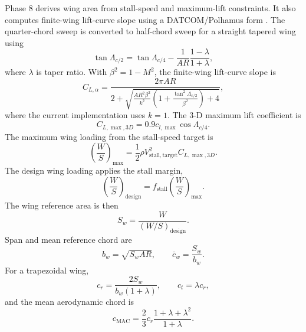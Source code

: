 Phase 8 derives wing area from stall-speed and maximum-lift constraints. It also computes finite-wing lift-curve slope using a DATCOM/Polhamus form \cite{USAFDATCOM1978,Polhamus1958}. The quarter-chord sweep is converted to half-chord sweep for a straight tapered wing using
\begin{equation}
    \tan \Lambda_{c/2}
    =
    \tan \Lambda_{c/4}
    -
    \frac{1}{AR}\frac{1-\lambda}{1+\lambda},
    \label{eq:ppa_half_chord_sweep}
\end{equation}
where \(\lambda\) is taper ratio. With \(\beta^2=1-M^2\), the finite-wing lift-curve slope is
\begin{equation}
    C_{L,\alpha}
    =
    \frac{2\pi AR}
    {2+
    \sqrt{
    \frac{AR^2\beta^2}{k^2}
    \left(1+\frac{\tan^2\Lambda_{c/2}}{\beta^2}\right)+4
    }},
    \label{eq:ppa_datcom_lift_slope}
\end{equation}
where the current implementation uses \(k=1\). The 3-D maximum lift coefficient is
\begin{equation}
    C_{L,\max,3D} = 0.9 c_{l,\max}\cos\Lambda_{c/4}.
    \label{eq:ppa_clmax3d}
\end{equation}
The maximum wing loading from the stall-speed target is
\begin{equation}
    \left(\frac{W}{S}\right)_{\max}
    =
    \frac{1}{2}\rho V_{\mathrm{stall,target}}^2 C_{L,\max,3D}.
    \label{eq:ppa_ws_stall_limit}
\end{equation}
The design wing loading applies the stall margin,
\begin{equation}
    \left(\frac{W}{S}\right)_{\mathrm{design}}
    =
    f_{\mathrm{stall}}
    \left(\frac{W}{S}\right)_{\max}.
    \label{eq:ppa_ws_design}
\end{equation}
The wing reference area is then
\begin{equation}
    S_w =
    \frac{W}{(W/S)_{\mathrm{design}}}.
    \label{eq:ppa_wing_area}
\end{equation}
Span and mean reference chord are
\begin{equation}
    b_w = \sqrt{S_w AR},
    \qquad
    \bar{c}_w=\frac{S_w}{b_w}.
    \label{eq:ppa_wing_span_chord}
\end{equation}
For a trapezoidal wing,
\begin{equation}
    c_r=\frac{2S_w}{b_w(1+\lambda)},
    \qquad
    c_t=\lambda c_r,
    \label{eq:ppa_root_tip_chord}
\end{equation}
and the mean aerodynamic chord is
\begin{equation}
    c_{\mathrm{MAC}} =
    \frac{2}{3}c_r
    \frac{1+\lambda+\lambda^2}{1+\lambda}.
    \label{eq:ppa_mac}
\end{equation}
